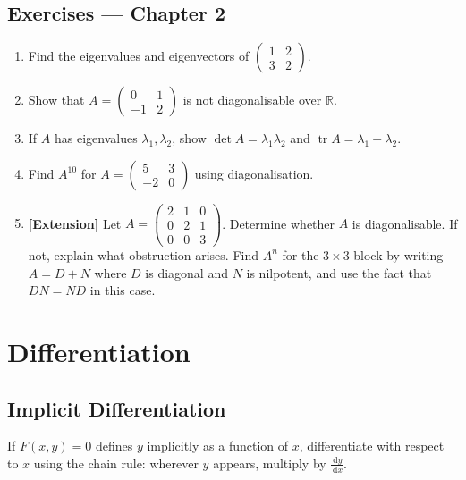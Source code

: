 \documentclass[12pt, a4paper]{book}
\newcommand{\R}{\mathbb{R}}
\newcommand{\dd}{\,\mathrm{d}}
\newcommand{\dx}{\,\mathrm{d}x}
\begin{document}
\section*{Exercises --- Chapter 2}
\begin{enumerate}[label=\textbf{\arabic*.}]
  \item Find the eigenvalues and eigenvectors of $\begin{pmatrix}1&2\\3&2\end{pmatrix}$.
  \item Show that $A=\begin{pmatrix}0&1\\-1&2\end{pmatrix}$ is not diagonalisable over $\R$.
  \item If $A$ has eigenvalues $\lambda_1,\lambda_2$, show $\det A=\lambda_1\lambda_2$ and $\operatorname{tr}A=\lambda_1+\lambda_2$.
  \item Find $A^{10}$ for $A=\begin{pmatrix}5&3\\-2&0\end{pmatrix}$ using diagonalisation.
  \item \textbf{[Extension]} Let $A=\begin{pmatrix}2&1&0\\0&2&1\\0&0&3\end{pmatrix}$. Determine whether $A$ is diagonalisable. If not, explain what obstruction arises. Find $A^n$ for the $3\times 3$ block by writing $A=D+N$ where $D$ is diagonal and $N$ is nilpotent, and use the fact that $DN=ND$ in this case.
\end{enumerate}

\chapter{Differentiation}

\section{Implicit Differentiation}

If $\displaystyle F(x,y)=0$ defines $\displaystyle y$ implicitly as a function of $\displaystyle x$, differentiate with respect to $\displaystyle x$ using the chain rule: wherever $\displaystyle y$ appears, multiply by $\displaystyle \frac{\dd y}{\dx}$.
\end{document}

